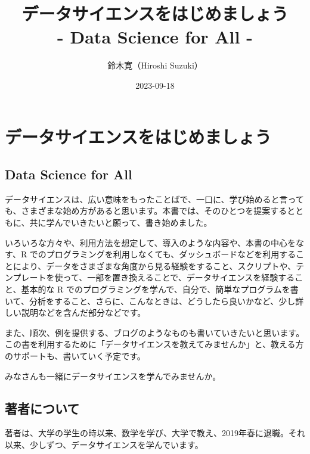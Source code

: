 \documentclass[
  xelatex, ja=standard]{bxjsbook}
\title{データサイエンスをはじめましょう\\
- Data Science for All -}
\author{鈴木寛（Hiroshi Suzuki）}
\date{2023-09-18}
\theoremstyle{definition}
\theoremstyle{definition}
\theoremstyle{definition}
\theoremstyle{definition}
\theoremstyle{remark}
\begin{document}
\maketitle

{
\setcounter{tocdepth}{1}
\tableofcontents
}
\hypertarget{ux30c7ux30fcux30bfux30b5ux30a4ux30a8ux30f3ux30b9ux3092ux306fux3058ux3081ux307eux3057ux3087ux3046}{%
\chapter*{データサイエンスをはじめましょう}\label{ux30c7ux30fcux30bfux30b5ux30a4ux30a8ux30f3ux30b9ux3092ux306fux3058ux3081ux307eux3057ux3087ux3046}}

\hypertarget{data-science-for-all}{%
\section*{Data Science for All}\label{data-science-for-all}}

データサイエンスは、広い意味をもったことばで、一口に、学び始めると言っても、さまざまな始め方があると思います。本書では、そのひとつを提案するとともに、共に学んでいきたいと願って、書き始めました。

いろいろな方々や、利用方法を想定して、導入のような内容や、本書の中心をなす、R でのプログラミングを利用しなくても、ダッシュボードなどを利用することにより、データをさまざまな角度から見る経験をすること、スクリプトや、テンプレートを使って、一部を置き換えることで、データサイエンスを経験すること、基本的な R でのプログラミングを学んで、自分で、簡単なプログラムを書いて、分析をすること、さらに、こんなときは、どうしたら良いかなど、少し詳しい説明などを含んだ部分などです。

また、順次、例を提供する、ブログのようなものも書いていきたいと思います。この書を利用するために「データサイエンスを教えてみませんか」と、教える方のサポートも、書いていく予定です。

みなさんも一緒にデータサイエンスを学んでみませんか。

\hypertarget{ux8457ux8005ux306bux3064ux3044ux3066}{%
\section*{著者について}\label{ux8457ux8005ux306bux3064ux3044ux3066}}

著者は、大学の学生の時以来、数学を学び、大学で教え、2019年春に退職。それ以来、少しずつ、データサイエンスを学んでいます。
\end{document}

